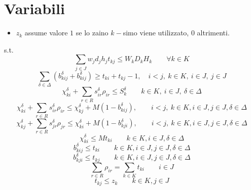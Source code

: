 \documentclass{scrartcl}
\begin{document}
\section{Variabili}
\begin{itemize}
	\item $z_k$ assume valore $1$ se lo zaino $k-$simo viene utilizzato, $0$ altrimenti.
\end{itemize}
	
	
s.t.
\begin{equation}
\sum_{j \in J} w_j d_j h_j t_{kj} \leq W_kD_kH_k \quad\quad \forall k \in K
\end{equation}
\begin{equation}
\sum_{\delta\in\Delta}(b_{kij}^\delta + b_{kij}^\delta) \geq t_{ki} + t_{kj} - 1, \quad i < j,\ k \in K,\ i \in J,\ j \in J
\end{equation}
\begin{equation}
\chi_{ki}^\delta + \sum_{r \in R} s_{ir}^\delta \rho_{ir} \leq S_k^\delta \quad \quad k \in K,\ i \in J,\ \delta \in \Delta
\end{equation}
\begin{equation}
\chi_{ki}^\delta + \sum_{r \in R} s_{ir}^\delta \rho_{ir} \leq \chi_{kj}^\delta + M(1 - b_{kij}^\delta), \quad \quad i < j,\ k \in K, i \in J, j \in J, \delta \in \Delta
\end{equation}
\begin{equation}
\chi_{kj}^\delta + \sum_{r \in R} s_{jr}^\delta \rho_{jr} \leq \chi_{ki}^\delta + M(1 - b_{kji}^\delta), \quad \quad i < j,\ k \in K, i \in J, j \in J, \delta \in \Delta
\end{equation}
\begin{equation}
\chi_{ki}^\delta \leq M t_{ki}\quad\quad k \in K, i \in J, \delta \in \Delta
\end{equation}
\begin{equation}
b_{kij}^\delta \leq t_{ki}\quad \quad k \in K, i \in J, j \in J, \delta \in \Delta
\end{equation}
\begin{equation}
b_{kji}^\delta \leq t_{kj} \quad \quad k \in K, i \in J, j \in J, \delta \in \Delta
\end{equation}
\begin{equation}
\sum_{r \in R} \rho_{ir} = \sum_{k \in K} t_{ki}\quad \quad i \in J
\end{equation}
\begin{equation}
\label{constraint:multi:tkzk}
t_{kj} \leq z_k\quad \quad k \in K, j \in J
\end{equation}
\end{document}
